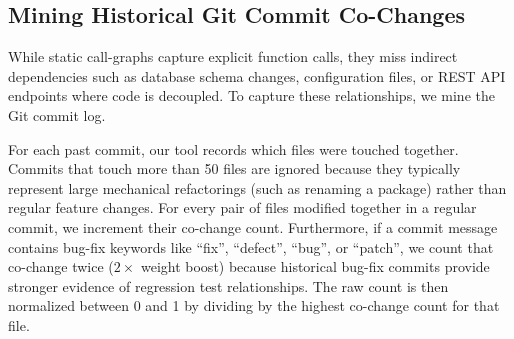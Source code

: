 \documentclass[12pt,onecolumn,draftclsnofoot]{IEEEtran}
\begin{document}
\subsection{Mining Historical Git Commit Co-Changes}
While static call-graphs capture explicit function calls, they miss indirect dependencies such as database schema changes, configuration files, or REST API endpoints where code is decoupled. To capture these relationships, we mine the Git commit log.

For each past commit, our tool records which files were touched together. Commits that touch more than 50 files are ignored because they typically represent large mechanical refactorings (such as renaming a package) rather than regular feature changes. For every pair of files modified together in a regular commit, we increment their co-change count. Furthermore, if a commit message contains bug-fix keywords like ``fix'', ``defect'', ``bug'', or ``patch'', we count that co-change twice ($2\times$ weight boost) because historical bug-fix commits provide stronger evidence of regression test relationships. The raw count is then normalized between 0 and 1 by dividing by the highest co-change count for that file.
\end{document}

